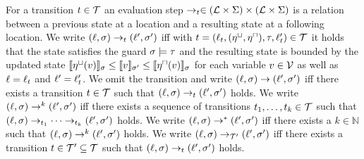 \begin{definition}[Evaluation] 
  For a transition $t \in \mathcal{T}$ an evaluation step $\rightarrow_t \in (\mathcal{L} \times \Sigma) \times (\mathcal{L} \times \Sigma)$ is a relation between a previous state at a location and a resulting state at a following location.
  We write $(\ell, \sigma) \rightarrow_t (\ell', \sigma')$ iff with $t = (\ell_t, (\eta^\sqcup, \eta^\sqcap), \tau, \ell_t') \in \mathcal{T}$ it holds that the state satisfies the guard $\sigma \models \tau$ and the resulting state is bounded by the updated state $ \llbracket \eta^\sqcup(v) \rrbracket_{\sigma} \leq \llbracket v \rrbracket_{\sigma'} \leq \llbracket \eta^\sqcap(v) \rrbracket_{\sigma}$ for each variable $v \in \mathcal{V}$ as well as $\ell = \ell_t$ and $\ell' = \ell_t'$.
  We omit the transition and write $(\ell, \sigma) \rightarrow (\ell', \sigma')$ iff there exists a transition $t \in \mathcal{T}$ such that $(\ell, \sigma) \rightarrow_t (\ell', \sigma')$ holds.
  We write $(\ell, \sigma) \rightarrow^k (\ell', \sigma')$ iff there exists a sequence of transitions $t_1, \dots, t_k \in \mathcal{T}$ such that $(\ell, \sigma) \rightarrow_{t_1} \dots \rightarrow_{t_k} (\ell', \sigma')$ holds.
  We write $(\ell, \sigma) \rightarrow^* (\ell', \sigma')$ iff there exists a $k \in \mathbb{N}$ such that $(\ell, \sigma) \rightarrow^k (\ell', \sigma')$ holds.
  We write $(\ell, \sigma) \rightarrow_{\mathcal{T}'} (\ell', \sigma')$ iff there exists a transition $t \in \mathcal{T}' \subseteq \mathcal{T}$ such that $(\ell, \sigma) \rightarrow_t (\ell', \sigma')$ holds.
\end{definition}
